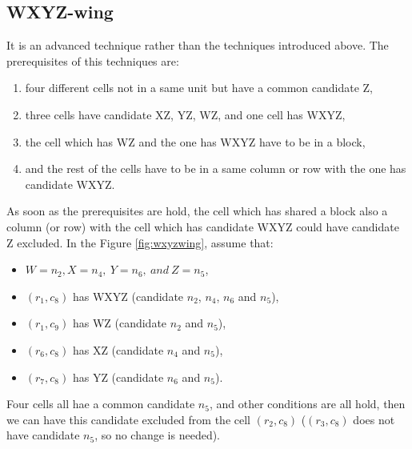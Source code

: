\documentclass[11pt]{report}
\begin{document}
\subsection{WXYZ-wing}
\label{sec:WXYZ-wing}
It is an advanced technique rather than the techniques introduced above. The prerequisites of this techniques are:
\begin{enumerate}
\item four different cells not in a same unit but have a common candidate Z,
\item three cells have candidate XZ, YZ, WZ, and one cell has WXYZ,
\item the cell which has WZ and the one has WXYZ have to be in a block,
\item and the rest of the cells have to be in a same column or row with the one has candidate WXYZ.
\end{enumerate}
As soon as the prerequisites are hold, the cell which has shared a block also a column (or row) with the cell which has candidate WXYZ could have candidate Z excluded.
In the Figure \ref{fig:wxyzwing}, assume that:
\begin{itemize}
\item $W= n_{2}, X = n_{4},\ Y = n_{6},\ and\ Z = n_{5}$,
\item $(r_{1}, c_{8})$ has WXYZ (candidate $n_{2}$, $n_{4}$, $n_{6}$ and $n_{5}$),
\item $(r_{1}, c_{9})$ has WZ (candidate $n_{2}$ and $n_{5}$),
\item $(r_{6}, c_{8})$ has XZ (candidate $n_{4}$ and $n_{5}$),
\item $(r_{7}, c_{8})$ has YZ (candidate $n_{6}$ and $n_{5}$).
\end{itemize}
Four cells all hae a common candidate $n_{5}$, and other conditions are all hold, then we can have this candidate excluded from the cell $(r_{2}, c_{8})$ ($(r_{3}, c_{8})$ does not have candidate $n_{5}$, so no change is needed).
\end{document}
